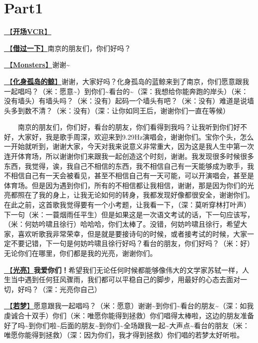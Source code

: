 \documentclass[]{ctexbook}
\begin{document}
\newpage

\section{Part1}\label{nanjing-20240811-part1}

\hyperref[opening-vcr]{🎥【\textbf{开场VCR}】}

\hyperref[I-will-go-my-way]{🎵【\textbf{借过一下}】}南京的朋友们，你们好吗？

\hyperref[Monsters]{🎵【\textbf{Monsters}】}谢谢\textasciitilde{}

\hyperref[hua-shen-gu-dao-de-jing]{🎵【\textbf{化身孤岛的鲸}】}谢谢，大家好吗？化身孤岛的蓝鲸来到了南京，你们愿意跟我一起唱吗？（米：愿意\textasciitilde）到你们\textasciitilde 看台的\textasciitilde（深：我想给你能奔跑的岸头）（米：没有墙头）有墙头吗？（米：没有）起码一个墙头有吧？（米：没有）难道是说墙头多到数不清？（米：没有）（深：让你如同王后，谢谢你们一直在等候）

  南京的朋友们，你们好，看台的朋友，你们看得到我吗？让我听到你们好不好，大家好，我是歌手周深，欢迎来到9.29Hz演唱会，谢谢你们。宝你个头，怎么一开始就听到，谢谢大家，今天对我来说意义非常重大，因为这是我人生中第一次连开体育场，所以谢谢你们来跟我一起创造这个时刻，谢谢。我发现很多时候很多东西，我觉得，诶，我自己不相信的东西，我不相信自己有一天能够成为歌手，我不相信自己有一天会被看见，甚至不相信自己有一天可能，可以开演唱会，甚至是体育场。但是因为遇到你们，所有的不相信都让我相信，谢谢，那是因为你们的光亮都照在了我的身上，让我无论如何的转身，我都发现好像都很安全，谢谢你们。在此之前，这首歌我觉得要有一个小考题，让我看一下，（深：莫听穿林打叶声）下一句（米：一蓑烟雨任平生）但是如果这是一次语文考试的话，下一句应该写，（米：何妨吟啸且徐行）哈哈哈，你们太棒了。没错，何妨吟啸且徐行，希望大家，喜欢听歌我非常荣幸，但是就是要接诗句的时候，或者接考试的时候，大家一定不要记错，下一句是何妨吟啸且徐行好吗？看台的朋友，你们好吗？（米：好）无论你们在哪里，你们都是我的光亮，谢谢你们。

\hyperref[silver-linings]{🎵【\textbf{光亮}】}\textbf{我爱你们！}希望我们无论任何时候都能够像伟大的文学家苏轼一样，人生当中遇到任何狂风骤雨，我们都可以平稳自己的脚步，用最好的心态去面对一切，好吗？（深：光亮你自己）

\hyperref[ruomeng]{🎵【\textbf{若梦}】}愿意跟我一起唱吗？（米：愿意）谢谢\textasciitilde 到你们\textasciitilde 看台的朋友\textasciitilde（深：如我虔诚合十双手）你们（米：唯愿你能得到拯救）你们唱得太棒啦，这边的朋友准备好了吗\textasciitilde 到你们啦\textasciitilde 后面的朋友\textasciitilde 到你们\textasciitilde 全场跟我一起\textasciitilde 大声点\textasciitilde 看台的朋友（米：唯愿你能得到拯救）（深：因为你们，我才得到拯救）你们唱的若梦太好听啦。
\end{document}
